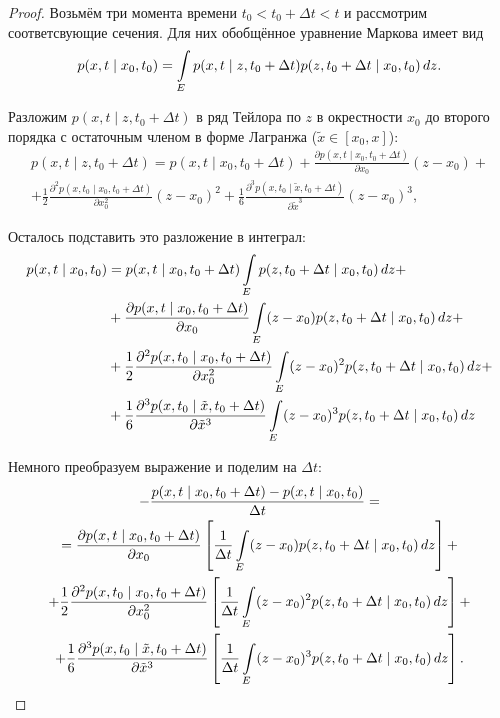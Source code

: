 \begin{proof}
	Возьмём три момента времени \(t_{0} < t_{0} + \Delta t < t\) и рассмотрим 
	соответсвующие сечения. Для них обобщённое уравнение Маркова имеет вид
	\[
		p(x, t \mid x_{0}, t_{0}) = \int\limits_{E} p(x, t \mid 
		z, t_{0} + \Delta t)p(z, t_{0} + \Delta t \mid x_{0}, t_{0})\mathop{}\!d z.
	\]
	
	Разложим \(p(x, t \mid z, t_{0} + \Delta t)\) в ряд Тейлора по \(z\) в 
	окрестности \(x_{0}\) до второго порядка с остаточным членом в форме 
	Лагранжа (\(\tilde{x} \in [x_{0}, x]\)): 
	\begin{multline*}
		p(x, t \mid z, t_{0} + \Delta t) = p(x, t \mid x_{0}, t_{0} + 
		\Delta t) + \frac{\partial p(x, t \mid x_{0}, t_{0} + \Delta 
		t)}{\partial x_{0}}(z - x_{0}) + \\ + 
		\frac{1}{2}\frac{\partial^{2} p(x, t_{0} \mid x_{0}, t_{0} + \Delta 
		t)}{\partial x_{0}^{2}}(z - x_{0})^{2} + 
		\frac{1}{6}\frac{\partial^{3} p(x, t_{0} \mid \tilde{x}, t_{0} + \Delta 
		t)}{\partial \tilde{x}^{3}}(z - x_{0})^{3}, 
	\end{multline*}

	Осталось подставить это разложение в интеграл:
	\begin{align*}
		p(x, t \mid x_{0}, t_{0}) &= p(x, t \mid x_{0}, t_{0} + \Delta 
		t)\int\limits_{E} p(z, t_{0} + \Delta t \mid x_{0}, t_{0})\mathop{}\!d z + \\ 
		&+ \frac{\partial p(x, t \mid x_{0}, t_{0} + \Delta t)}{\partial 
		x_{0}}\int\limits_{E} (z - x_{0})p(z, t_{0} + \Delta t \mid x_{0}, 
		t_{0})\mathop{}\!d z + \\
		&+ \frac{1}{2}\frac{\partial^{2} p(x, t_{0} \mid x_{0}, 
		t_{0} + \Delta t)}{\partial x_{0}^{2}}\int\limits_{E} (z - 
		x_{0})^{2}p(z, t_{0} + \Delta t \mid x_{0}, t_{0})\mathop{}\!d z + \\
		&+ \frac{1}{6}\frac{\partial^{3} p(x, t_{0} \mid \tilde{x}, t_{0} + 
		\Delta t)}{\partial \tilde{x}^{3}}\int\limits_{E} (z - 
		x_{0})^{3}p(z, t_{0} + \Delta t \mid x_{0}, t_{0})\mathop{}\!d z
	\end{align*}

	Немного преобразуем выражение и поделим на \(\Delta t\):
	\begin{multline*}
		-\frac{p(x, t \mid x_{0}, t_{0} + \Delta t) - p(x, t \mid x_{0}, 
		t_{0})}{\Delta t} = \\ 
		= \frac{\partial p(x, t \mid x_{0}, t_{0} + \Delta t)}{\partial x_{0}} 
		\left[\frac{1}{\Delta t}\int\limits_{E} (z - x_{0})p(z, t_{0} + \Delta 
		t \mid x_{0}, t_{0})\mathop{}\!d z\right] + \\
		+ \frac{1}{2}\frac{\partial^{2} p(x, t_{0} \mid x_{0}, t_{0} + \Delta 
		t)}{\partial x_{0}^{2}}\left[\frac{1}{\Delta t}\int\limits_{E} (z - 
		x_{0})^{2}p(z, t_{0} + \Delta t \mid x_{0}, t_{0})\mathop{}\!d z\right] + \\
		+ \frac{1}{6}\frac{\partial^{3} p(x, t_{0} \mid \tilde{x}, t_{0} + 
		\Delta t)}{\partial \tilde{x}^{3}}\left[\frac{1}{\Delta 
		t}\int\limits_{E} (z - x_{0})^{3}p(z, t_{0} + \Delta t \mid x_{0}, 
		t_{0})\mathop{}\!d z\right].
	\end{multline*}


\end{proof}
